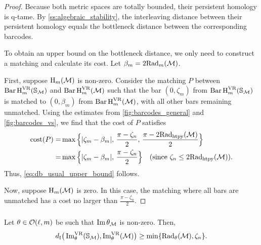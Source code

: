 \begin{proof}
    Because both metric spaces are totally bounded, their persistent homology is q-tame.
    By \cref{ss:algebraic_stability}, the interleaving distance between their persistent homology equals the bottleneck distance between the corresponding barcodes.

    To obtain an upper bound on the bottleneck distance, we only need to construct a matching and calculate its cost. Let \( \beta_m = 2\firstdeath{m}{\cM} \).

    First, suppose \( \opH_m(\cM) \) is non-zero.
    Consider the matching \( P \) between \( \Hbarc[\field]{m}{\bS_{\cM}} \) and \( \Hbarc[\field]{m}{\cM} \) such that the bar \( (0, \zeta_m) \) from \( \Hbarc[\field]{m}{\bS_{\cM}} \) is matched to \( (0, \beta_m) \) from \( \Hbarc[\field]{m}{\cM} \), with all other bars remaining unmatched. Using the estimates from \cref{fig:barcodes_general} and \cref{fig:barcodes_vs}, we find that the cost of \( P \) satisfies
    \begin{align*}
        \cost(P)
        = & \max\Big\{|\zeta_m - \beta_m|,\, \frac{\pi - \zeta_n}{2},\, \frac{\pi - 2\crit(\cM)}{2}\Big\} \\
        = & \max\Big\{|\zeta_m - \beta_m|,\, \frac{\pi - \zeta_n}{2}\Big\} \quad \text{(since \( \zeta_n \leq 2\crit(\cM) \))}.
    \end{align*}
    Thus, \cref{eq:db_usual_upper_bound} follows.

    Now, suppose \( \opH_m(\cM) \) is zero. In this case, the matching where all bars are unmatched has a cost no larger than \( \frac{\pi - \zeta_n}{2}\).
\end{proof}

\subsubsection{}\label{sss:db_theta_lower_bound}

\medskip\lemma
Let $\theta \in \cO(\ell, m)$ be such that $\img \theta_\cM$ is non-zero.
Then,
\begin{equation}\label{eq:db_theta_lower_bound}
	\di\big(\img^{\VR}_{\theta}(\bS_{\cM}), \img^{\VR}_{\theta}(\cM)\big)
	\geq \min\{\firstdeath{\theta}{\cM}, \zeta_n\}. %
\end{equation}

